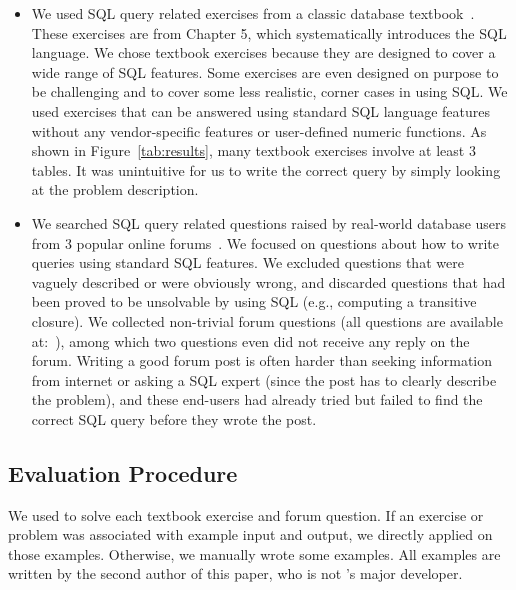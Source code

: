 \begin{itemize}
\item We used \allex SQL query related exercises
from a classic database textbook~\cite{cowbook}.
These exercises are from Chapter 5, which systematically
introduces the SQL language. We chose textbook exercises
because they are designed to
cover a wide range of SQL features. Some exercises
are even designed on purpose to be challenging and to cover some less realistic,
corner cases in using SQL. 
We used \allex exercises that can be answered using standard
SQL language features without any vendor-specific
features or user-defined numeric functions.
As shown in Figure~\ref{tab:results},
many textbook exercises involve at least 3 tables. It was unintuitive
for us to write the correct query by simply looking at the problem
description.

\item We searched SQL query related questions raised by real-world
database users from 3 popular online forums~\cite{stackoverflow,
tutorialized, dbjournal}.
We focused on questions about how to write queries
using standard SQL features.
We excluded questions that were vaguely described or were obviously
wrong, and discarded questions that had been proved
to be unsolvable by using SQL (e.g., computing a
transitive closure).
We collected \pnum non-trivial forum questions
(all questions are available at:~\cite{forumq}), among which
two questions even did not receive any reply on the forum.
Writing a good forum post is often harder than seeking 
information from internet or asking
a SQL expert (since the post has to clearly 
describe the problem), and these end-users had already tried but
failed to find the correct SQL query before they wrote the post.
\end{itemize}



\vspace{-2mm}
\subsection{Evaluation Procedure}
\vspace{-1mm}

We used \ourtool to solve each textbook exercise and forum
question. If an exercise or problem
was associated with example input and output,
we directly applied \ourtool on those examples.
Otherwise, we manually wrote some examples.
All examples are written by the second author
of this paper, who is not \ourtool's major developer.

